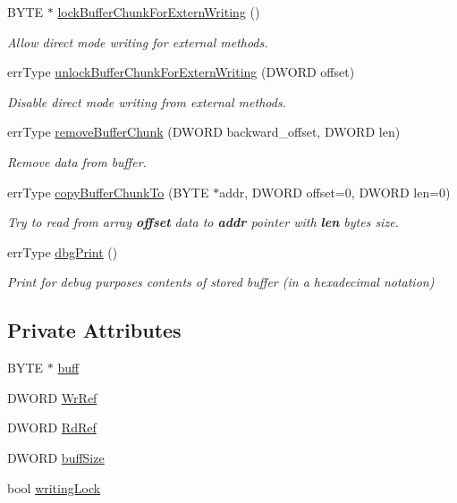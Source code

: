 \begin{DoxyCompactItemize}
BYTE $\ast$ \hyperlink{classbuffer_a23c22c6b1c9069d6f89e7e24ddb79098}{lockBufferChunkForExternWriting} ()
\begin{DoxyCompactList}\small\item\em Allow direct mode writing for external methods. \item\end{DoxyCompactList}\item 
errType \hyperlink{classbuffer_ad30546067be59176c1b5949c2aa8edf3}{unlockBufferChunkForExternWriting} (DWORD offset)
\begin{DoxyCompactList}\small\item\em Disable direct mode writing from external methods. \item\end{DoxyCompactList}\item 
errType \hyperlink{classbuffer_a46f65224d87068ad28b113bcd17e2dd6}{removeBufferChunk} (DWORD backward\_\-offset, DWORD len)
\begin{DoxyCompactList}\small\item\em Remove data from buffer. \item\end{DoxyCompactList}\item 
errType \hyperlink{classbuffer_a9570605f76e0f56c409852b350560003}{copyBufferChunkTo} (BYTE $\ast$addr, DWORD offset=0, DWORD len=0)
\begin{DoxyCompactList}\small\item\em Try to read from array {\bfseries offset} data to {\bfseries addr} pointer with {\bfseries len} bytes size. \item\end{DoxyCompactList}\item 
errType \hyperlink{classbuffer_a62a0c1433fb163e7c1958bc370ebbeb2}{dbgPrint} ()
\begin{DoxyCompactList}\small\item\em Print for debug purposes contents of stored buffer (in a hexadecimal notation) \item\end{DoxyCompactList}\end{DoxyCompactItemize}
\subsection*{Private Attributes}
\begin{DoxyCompactItemize}
\item 
BYTE $\ast$ \hyperlink{classbuffer_ae70ebdaeb6cf086f70dd4a49a4ece346}{buff}
\item 
DWORD \hyperlink{classbuffer_a885ec1136d2da49c6ca00137016a4020}{WrRef}
\item 
DWORD \hyperlink{classbuffer_adc90e509cdd156719b87c39fbb3af666}{RdRef}
\item 
DWORD \hyperlink{classbuffer_a9197dbc0e3e7e28442da5efb341d3616}{buffSize}
\item 
bool \hyperlink{classbuffer_ae345578999bc86d4ccda1ea66aeab11d}{writingLock}
\end{DoxyCompactItemize}


